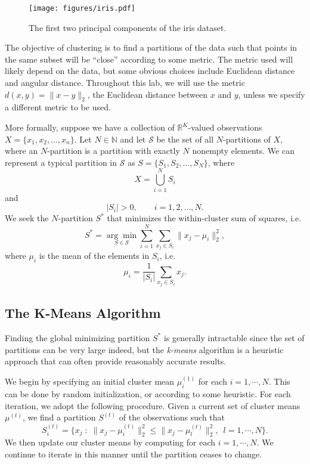 \begin{figure}
\centering
\texttt{[image: figures/iris.pdf]}
\caption{The first two principal components of the iris dataset.}
\label{fig:iris_data}
\end{figure}

The objective of clustering is to find a partitions of the data such that points in the same subset will be ``close'' according to some metric.
The metric used will likely depend on the data, but some obvious choices include Euclidean distance and angular distance.
Throughout this lab, we will use the metric $d(x,y) = \|x-y\|_2$, the Euclidean distance between $x$ and $y$, unless we specify a different metric to be used.

More formally, suppose we have a collection of $\mathbb{R}^K$-valued observations $X = \{x_1,x_2,\ldots,x_n\}$.
Let $N \in \mathbb{N}$ and let $\mathcal{S}$ be the set of all $N$-partitions of $X$, where an $N$-partition is a partition with exactly $N$ nonempty elements.
We can represent a typical partition in $\mathcal{S}$ as $S = \{S_1,S_2,\ldots,S_N\}$, where
\begin{equation*}
    X = \bigcup_{i=1}^N S_i
\end{equation*}
and
\begin{equation*}
    |S_i| > 0, \qquad i=1,2,\ldots,N.
\end{equation*}
We seek the $N$-partition $S^*$ that minimizes the within-cluster sum of squares, i.e.
\begin{equation*}
    S^* = \underset{S\in\mathcal{S}}{\arg\min} \sum_{i=1}^N\sum_{x_j\in S_i}\|x_j-\mu_i\|_2^2,
\end{equation*}
where $\mu_i$ is the mean of the elements in $S_i$, i.e.
\begin{equation*}
    \mu_i = \frac{1}{|S_i|}\sum_{x_j\in S_i}x_j.
\end{equation*}

\subsection*{The K-Means Algorithm}

Finding the global minimizing partition $S^*$ is generally intractable since the set of partitions can be very large indeed,
but the \emph{k-means} algorithm is a heuristic approach that can often provide reasonably accurate results.


We begin by specifying an initial cluster mean $\mu_i^{(1)}$ for each $i = 1, \cdots, N$.
This can be done by random initialization, or according to some heuristic.
For each iteration, we adopt the following procedure.
Given a current set of cluster means $\mu^{(t)}$, we find a partition $S^{(t)}$ of the observations such that
\begin{equation*}
S_{i}^{(t)} = \{x_j \; : \; \|x_j - \mu_{i}^{(t)}\|_2^2 \leq \|x_j - \mu_{l}^{(t)}\|_2^2,\,\,\,  l = 1, \cdots, N\}.
\end{equation*}
We then update our cluster means by computing for each $i = 1, \cdots, N$.
We continue to iterate in this manner until the partition ceases to change.


